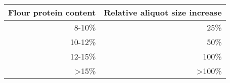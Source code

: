 


\begin{tabular}{rr}
\toprule
\multicolumn{1}{l}{\textbf{Flour protein content}} & \multicolumn{1}{l}{\textbf{Relative aliquot size increase}} \\ \midrule
8-10\%                                               & 25\%                                                         \\ \midrule
10-12\%                                              & 50\%                                                         \\ \midrule
12-15\%                                              & 100\%                                                        \\ \midrule
\textgreater 15\%                                    & \textgreater 100\%
\\ \bottomrule
\end{tabular}

